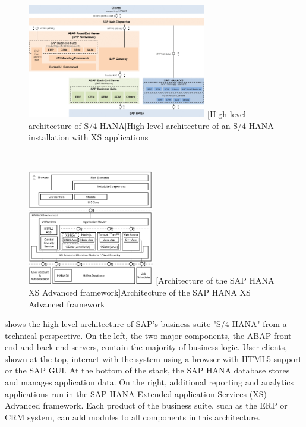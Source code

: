 \begin{figure}
\centering
\begin{minipage}{.56\textwidth}
  \centering
  \includegraphics[height=50mm]{img/s4hana}
  [High-level architecture of S/4 HANA]{High-level architecture of an S/4 HANA installation with XS applications~\cite{sap17:setup_of_sap_fiori}\linebreak}
  \label{fig:s4hana}
\end{minipage}~~~%
\begin{minipage}{.42\textwidth}
  \centering
  \includegraphics[height=50mm]{img/xsa}
  [Architecture of the SAP HANA XS Advanced framework]{Architecture of the SAP HANA XS Advanced framework~\cite{subatin17:xs_advanced_for_not}}
  \label{fig:xsa}
\end{minipage}
\end{figure}

 shows the high-level architecture of SAP's business suite "S/4 HANA" from a technical perspective. 
On the left, the two major components, the ABAP front-end and back-end servers, contain the majority of business logic.
User clients, shown at the top, interact with the system using a browser with HTML5 support or the SAP GUI.
At the bottom of the stack, the SAP HANA database stores and manages application data.
On the right, additional reporting and analytics applications run in the SAP HANA Extended application Services (XS) Advanced framework.
Each product of the business suite, such as the ERP or CRM system, can add modules to all components in this architecture.

